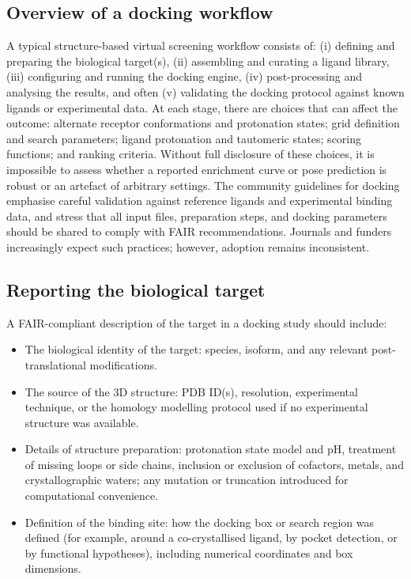 \documentclass[12pt]{article}
\begin{document}
\subsection{Overview of a docking workflow}

A typical structure-based virtual screening workflow consists of: (i) defining and preparing the biological target(s), (ii) assembling and curating a ligand library, (iii) configuring and running the docking engine, (iv) post-processing and analysing the results, and often (v) validating the docking protocol against known ligands or experimental data\cite{CH12_plos2025tenDocking,CH12_rigorRepro2020}. At each stage, there are choices that can affect the outcome: alternate receptor conformations and protonation states; grid definition and search parameters; ligand protonation and tautomeric states; scoring functions; and ranking criteria. Without full disclosure of these choices, it is impossible to assess whether a reported enrichment curve or pose prediction is robust or an artefact of arbitrary settings. The community guidelines for docking emphasise careful validation against reference ligands and experimental binding data, and stress that all input files, preparation steps, and docking parameters should be shared to comply with FAIR recommendations\cite{CH12_plos2025tenDocking,CH12_toolsRepro2016,CH12_reproWorkflows2017}. Journals and funders increasingly expect such practices; however, adoption remains inconsistent.

\subsection{Reporting the biological target}

A FAIR-compliant description of the target in a docking study should include:

\begin{itemize}
  \item The biological identity of the target: species, isoform, and any relevant post-translational modifications.
  \item The source of the 3D structure: PDB ID(s), resolution, experimental technique, or the homology modelling protocol used if no experimental structure was available.
  \item Details of structure preparation: protonation state model and pH, treatment of missing loops or side chains, inclusion or exclusion of cofactors, metals, and crystallographic waters; any mutation or truncation introduced for computational convenience.
  \item Definition of the binding site: how the docking box or search region was defined (for example, around a co-crystallised ligand, by pocket detection, or by functional hypotheses), including numerical coordinates and box dimensions.
\end{itemize}
\end{document}
